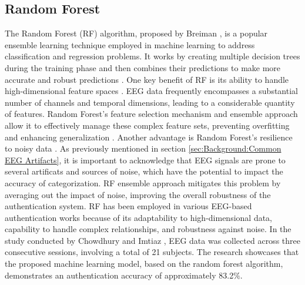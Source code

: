 {%
\subsection{Random Forest}
The Random Forest (RF) algorithm, proposed by Breiman \cite{breiman2001random}, is a popular ensemble learning technique employed in machine learning to address classification and regression problems. It works by creating multiple decision trees during the training phase and then combines their predictions to make more accurate and robust predictions \cite{zhang2018new}. One key benefit of RF is its ability to handle high-dimensional feature spaces \cite{dm2020random}. EEG data frequently encompasses a substantial number of channels and temporal dimensions, leading to a considerable quantity of features. Random Forest's feature selection mechanism and ensemble approach allow it to effectively manage these complex feature sets, preventing overfitting and enhancing generalization \cite{dm2020random}. Another advantage is Random Forest's resilience to noisy data \cite{breiman2001random}. As previously mentioned in section \ref{sec:Background:Common EEG Artifacts}, it is important to acknowledge that EEG signals are prone to several artificats and sources of noise, which have the potential to impact the accuracy of categorization. RF ensemble approach mitigates this problem by averaging out the impact of noise, improving the overall robustness of the authentication system. RF has been employed in various EEG-based authentication works because of its adaptability to high-dimensional data, capability to handle complex relationships, and robustness against noise.
In the study conducted by Chowdhury and Imtiaz \cite{chowdhury2023machine}, EEG data was collected across three consecutive sessions, involving a total of 21 subjects. The research showcases that the proposed machine learning model, based on the random forest algorithm, demonstrates an authentication accuracy of approximately 83.2$\%$. 

}
